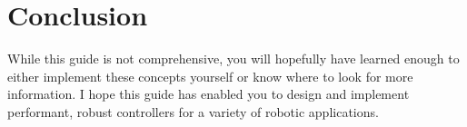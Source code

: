 \section{Conclusion}

While this guide is not comprehensive, you will hopefully have learned enough to
either implement these concepts yourself or know where to look for more
information. I hope this guide has enabled you to design and implement
performant, robust controllers for a variety of robotic applications.
